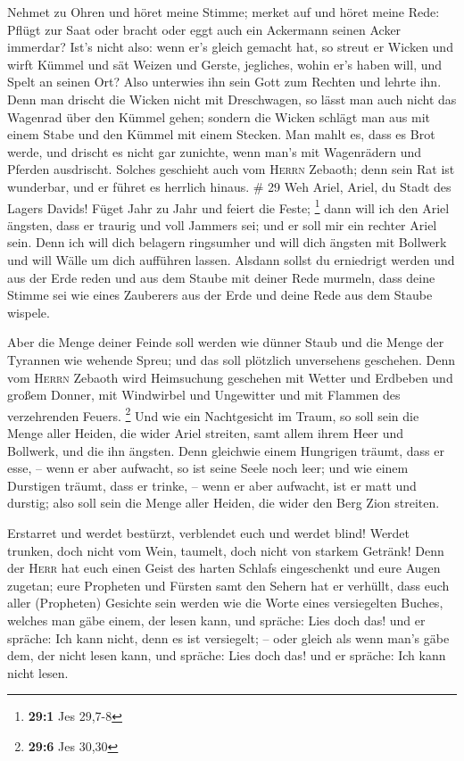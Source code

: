  Nehmet zu Ohren und höret meine Stimme; merket auf und
höret meine Rede:  Pflügt zur Saat oder bracht oder eggt
auch ein Ackermann seinen Acker immerdar?  Ist's nicht
also: wenn er's gleich gemacht hat, so streut er Wicken und wirft Kümmel
und sät Weizen und Gerste, jegliches, wohin er's haben will, und Spelt
an seinen Ort?  Also unterwies ihn sein Gott zum Rechten
und lehrte ihn.  Denn man drischt die Wicken nicht mit
Dreschwagen, so lässt man auch nicht das Wagenrad über den Kümmel gehen;
sondern die Wicken schlägt man aus mit einem Stabe und den Kümmel mit
einem Stecken.  Man mahlt es, dass es Brot werde, und
drischt es nicht gar zunichte, wenn man's mit Wagenrädern und Pferden
ausdrischt.  Solches geschieht auch vom \textsc{Herrn}
Zebaoth; denn sein Rat ist wunderbar, und er führet es herrlich hinaus.
\# 29  Weh Ariel, Ariel, du Stadt des Lagers Davids! Füget
Jahr zu Jahr und feiert die Feste; \footnote{\textbf{29:1} Jes 29,7-8}
 dann will ich den Ariel ängsten, dass er traurig und voll
Jammers sei; und er soll mir ein rechter Ariel sein.  Denn
ich will dich belagern ringsumher und will dich ängsten mit Bollwerk und
will Wälle um dich aufführen lassen.  Alsdann sollst du
erniedrigt werden und aus der Erde reden und aus dem Staube mit deiner
Rede murmeln, dass deine Stimme sei wie eines Zauberers aus der Erde und
deine Rede aus dem Staube wispele.

 Aber die Menge deiner Feinde soll werden wie dünner Staub
und die Menge der Tyrannen wie wehende Spreu; und das soll plötzlich
unversehens geschehen.  Denn vom \textsc{Herrn} Zebaoth
wird Heimsuchung geschehen mit Wetter und Erdbeben und großem Donner,
mit Windwirbel und Ungewitter und mit Flammen des verzehrenden Feuers.
\footnote{\textbf{29:6} Jes 30,30}  Und wie ein
Nachtgesicht im Traum, so soll sein die Menge aller Heiden, die wider
Ariel streiten, samt allem ihrem Heer und Bollwerk, und die ihn ängsten.
 Denn gleichwie einem Hungrigen träumt, dass er esse, --
wenn er aber aufwacht, so ist seine Seele noch leer; und wie einem
Durstigen träumt, dass er trinke, -- wenn er aber aufwacht, ist er matt
und durstig; also soll sein die Menge aller Heiden, die wider den Berg
Zion streiten.

 Erstarret und werdet bestürzt, verblendet euch und werdet
blind! Werdet trunken, doch nicht vom Wein, taumelt, doch nicht von
starkem Getränk!  Denn der \textsc{Herr} hat euch einen
Geist des harten Schlafs eingeschenkt und eure Augen zugetan; eure
Propheten und Fürsten samt den Sehern hat er verhüllt, 
dass euch aller (Propheten) Gesichte sein werden wie die Worte eines
versiegelten Buches, welches man gäbe einem, der lesen kann, und
spräche: Lies doch das! und er spräche: Ich kann nicht, denn es ist
versiegelt; --  oder gleich als wenn man's gäbe dem, der
nicht lesen kann, und spräche: Lies doch das! und er spräche: Ich kann
nicht lesen.

